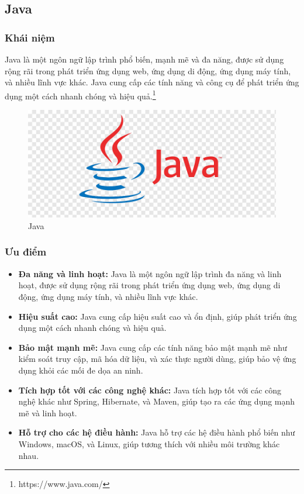\subsection{Java}
\subsubsection{Khái niệm}
\noindent Java là một ngôn ngữ lập trình phổ biến, mạnh mẽ và đa năng, được sử dụng rộng rãi trong phát triển ứng dụng web, ứng dụng di động, ứng dụng máy tính, và nhiều lĩnh vực khác. Java cung cấp các tính năng và công cụ để phát triển ứng dụng một cách nhanh chóng và hiệu quả.\footnote{https://www.java.com/}
\begin{figure}[H]
  \begin{center}
    \includegraphics[scale=0.3]{images/hieu/phuluc/java.png}
    \caption{Java}
  \end{center}
\end{figure}
\subsubsection{Ưu điểm}
\begin{itemize}
  \item \textbf{Đa năng và linh hoạt:} Java là một ngôn ngữ lập trình đa năng và linh hoạt, được sử dụng rộng rãi trong phát triển ứng dụng web, ứng dụng di động, ứng dụng máy tính, và nhiều lĩnh vực khác.
  \item \textbf{Hiệu suất cao:} Java cung cấp hiệu suất cao và ổn định, giúp phát triển ứng dụng một cách nhanh chóng và hiệu quả.
  \item \textbf{Bảo mật mạnh mẽ:} Java cung cấp các tính năng bảo mật mạnh mẽ như kiểm soát truy cập, mã hóa dữ liệu, và xác thực người dùng, giúp bảo vệ ứng dụng khỏi các mối đe dọa an ninh.
  \item \textbf{Tích hợp tốt với các công nghệ khác:} Java tích hợp tốt với các công nghệ khác như Spring, Hibernate, và Maven, giúp tạo ra các ứng dụng mạnh mẽ và linh hoạt.
  \item \textbf{Hỗ trợ cho các hệ điều hành:} Java hỗ trợ các hệ điều hành phổ biến như Windows, macOS, và Linux, giúp tương thích với nhiều môi trường khác nhau.
\end{itemize}
